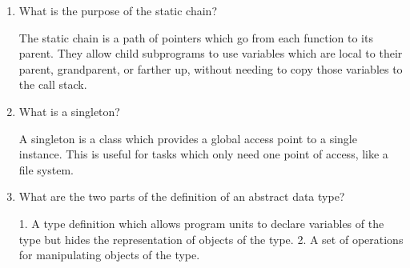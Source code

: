 \begin{enumerate}
  \item What is the purpose of the static chain?
        \begin{answer}
The static chain is a path of pointers which go from each function to its parent. They allow child subprograms to use variables which are local to their parent, grandparent, or farther up, without needing to copy those variables to the call stack.
	\end{answer}

  \item What is a singleton?
    \begin{answer}
A singleton is a class which provides a global access point to a single instance. This is useful for tasks which only need one point of access, like a file system.
 \end{answer}

  \item What are the two parts of the definition
    of an abstract data type?
    \begin{answer}
1. A type definition which allows program units to declare variables of the type but hides the representation of objects of the type. 2. A set of operations for manipulating objects of the type.
 \end{answer}
  \end{enumerate}



